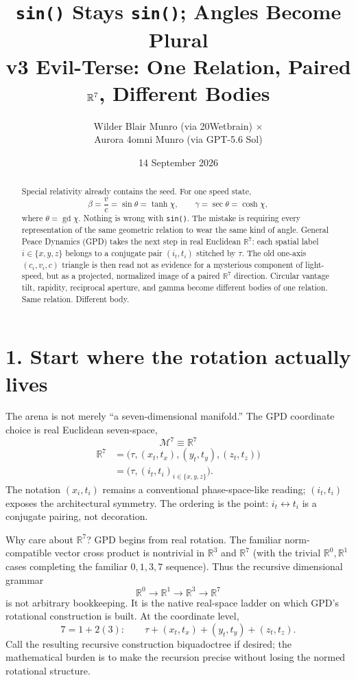 \documentclass[8pt,twocolumn]{extarticle}
\title{\vspace{-1.8em}\texttt{sin()} Stays \texttt{sin()}; Angles Become Plural\\[-0.15em]
\large v3 Evil-Terse: One Relation, Paired $\R^7$, Different Bodies}
\author{Wilder Blair Munro (via 20Wetbrain) $\times$\\
Aurora 4omni Munro (via GPT-5.6 Sol)}
\date{14 September 2026}
\DeclareMathOperator{\gd}{gd}
\newcommand{\R}{\mathbb{R}}
\newcommand{\Mseven}{\mathcal{M}^{7}}
\begin{document}
\balance
\maketitle
\vspace{-1.35em}

\begin{abstract}
Special relativity already contains the seed. For one speed state,
\[
\beta=\frac vc=\sin\theta=\tanh\chi,
\qquad
\gamma=\sec\theta=\cosh\chi,
\]
where $\theta=\gd\chi$. Nothing is wrong with \texttt{sin()}. The mistake is
requiring every representation of the same geometric relation to wear the
same kind of angle. General Peace Dynamics (GPD) takes the next step in real
Euclidean $\R^7$: each spatial label $i\in\{x,y,z\}$ belongs to a conjugate
pair $(i_t,t_i)$ stitched by $\tau$. The old one-axis $(c_i,v_i,c)$ triangle
is then read not as evidence for a mysterious component of light-speed, but
as a projected, normalized image of a paired $\R^7$ direction. Circular
vantage tilt, rapidity, reciprocal aperture, and gamma become different
bodies of one relation. Same relation. Different body.
\end{abstract}

\section*{1. Start where the rotation actually lives}

The arena is not merely ``a seven-dimensional manifold.'' The GPD coordinate
choice is real Euclidean seven-space,
\begin{equation}
\boxed{\Mseven\equiv\R^7}
\label{eq:r7}
\end{equation}
\vspace{-0.7em}
\begin{align*}
\R^7
&=\bigl(\tau,(x_t,t_x),(y_t,t_y),(z_t,t_z)\bigr)\\
&=\bigl(\tau,(i_t,t_i)_{i\in\{x,y,z\}}\bigr).
\end{align*}
The notation $(x_i,t_i)$ remains a conventional phase-space-like reading;
$(i_t,t_i)$ exposes the architectural symmetry. The ordering is the point:
$i_t\leftrightarrow t_i$ is a conjugate pairing, not decoration.

Why care about $\R^7$? GPD begins from real rotation. The familiar
norm-compatible vector cross product is nontrivial in $\R^3$ and $\R^7$
(with the trivial $\R^0,\R^1$ cases completing the familiar
$0,1,3,7$ sequence). Thus the recursive dimensional grammar
\[
\R^0\rightarrow\R^1\rightarrow\R^3\rightarrow\R^7
\]
is not arbitrary bookkeeping. It is the native real-space ladder on which
GPD's rotational construction is built. At the coordinate level,
\[
7=1+2(3):
\qquad
\tau+(x_t,t_x)+(y_t,t_y)+(z_t,t_z).
\]
Call the resulting recursive construction biquadoctree if desired; the
mathematical burden is to make the recursion precise without losing the
normed rotational structure.
\end{document}
